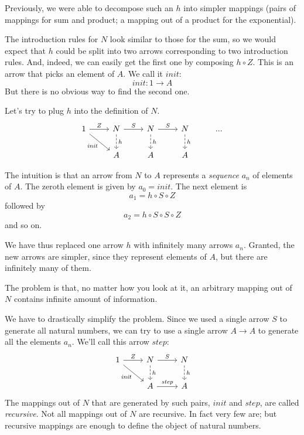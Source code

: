 \documentclass[DaoFP]{subfiles}
\begin{document}
Previously, we were able to decompose such an $h$ into simpler mappings (pairs of mappings for sum and product; a mapping out of a product for the exponential). 

The introduction rules for $N$ look similar to those for the sum, so we would expect that $h$ could be split into two arrows corresponding to two introduction rules. And, indeed, we can easily get the first one by composing $h \circ Z$. This is an arrow that picks an element of $A$. We call it $\mathit{init}$:
\[\mathit{init} \colon 1 \to A \]
But there is no obvious way to find the second one. 


Let's try to plug $h$ into the definition of $N$.
\[
 \begin{tikzcd}
 1
 \arrow[r, "Z"]
 \arrow[rd, "\mathit{init}"']
 &N
  \arrow[r, "S"]
\arrow[d, dashed, "h"]
&N
  \arrow[r, "S"]
\arrow[d, dashed, "h"]
&N
\arrow[d, dashed, "h"]
& ...
\\
& A
& A
& A
  \end{tikzcd}
\]

The intuition is that an arrow from $N$ to $A$ represents a \emph{sequence} $a_n$ of elements of $A$. The zeroth element is given by $a_0=\mathit{init}$. The next element is
\[a_1 = h \circ S \circ Z \]
followed by
\[a_2 = h \circ S \circ S \circ Z \]
and so on.

We have thus replaced one arrow $h$ with infinitely many arrows $a_n$. Granted, the new arrows are simpler, since they represent elements of $A$, but there are infinitely many of them. 

The problem is that, no matter how you look at it, an arbitrary mapping out of $N$ contains infinite amount of information.

We have to drastically simplify the problem. Since we used a single arrow $S$ to generate all natural numbers, we can try to use a single arrow $A \to A$ to generate all the elements $a_n$. We'll call this arrow $\mathit{step}$:
\[
 \begin{tikzcd}
 1
 \arrow[r, "Z"]
 \arrow[rd, "\mathit{init}"']
 &N
  \arrow[r, "S"]
\arrow[d, dashed, "h"]
&N
\arrow[d, dashed, "h"]
\\
& A
\arrow[r, "\mathit{step}"]
& A
  \end{tikzcd}
\]
The mappings out of $N$ that are generated by such pairs, $\mathit{init}$ and $\mathit{step}$, are called \emph{recursive}. Not all mappings out of $N$ are recursive. In fact very few are; but recursive mappings are enough to define the object of natural numbers. 
\end{document}
